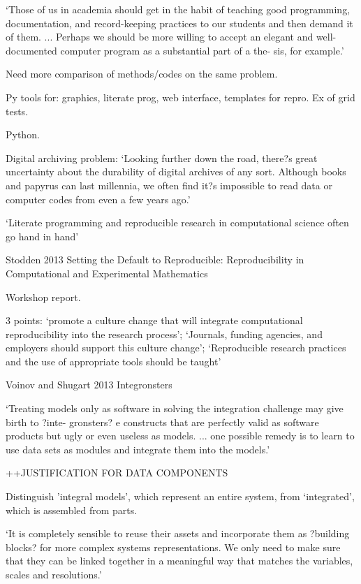 \documentclass[12pt]{amsart}
\begin{document}
`Those of us in academia should get in the habit of teaching good programming, documentation, and record-keeping practices to our students and then demand it of them. ... Perhaps we should be more willing to accept an elegant and well-documented computer program as a substantial part of a the- sis, for example.'

Need more comparison of methods/codes on the same problem.

Py tools for: graphics, literate prog, web interface, templates for repro. Ex of grid tests. 

Python.

Digital archiving problem: `Looking further down the road, there?s great uncertainty about the durability of digital archives of any sort. Although books and papyrus can last millennia, we often find it?s impossible to read data or computer codes from even a few years ago.'

`Literate programming and reproducible research in computational science often go hand in hand'





Stodden 2013 Setting the Default to Reproducible: Reproducibility in Computational and Experimental Mathematics

Workshop report. 

3 points: `promote a culture change that will integrate computational reproducibility into the research process'; `Journals, funding agencies, and employers should support this culture change'; `Reproducible research practices and the use of appropriate tools should be taught'


Voinov and Shugart 2013 Integronsters

`Treating models only as software in solving the integration challenge may give birth to ?inte- gronsters? e constructs that are perfectly valid as software products but ugly or even useless as models. ... one possible remedy is to learn to use data sets as modules and integrate them into the models.'

++JUSTIFICATION FOR DATA COMPONENTS

Distinguish 'integral models', which represent an entire system, from `integrated', which is assembled from parts.

`It is completely sensible to reuse their assets and incorporate them as ?building blocks? for more complex systems representations. We only need to make sure that they can be linked together in a meaningful way that matches the variables, scales and resolutions.'
\end{document}
